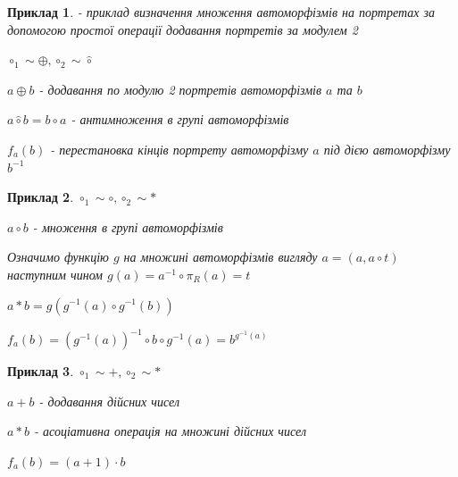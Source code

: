\documentclass[a4paper,12pt]{article} \usepackage{a4wide}
\numberwithin{equation}{subsection}
\newtheorem{example}{Приклад}[subsection]
\begin{document}
  \begin{example}
     - приклад визначення
    множення автоморфізмів на портретах за допомогою простої операції
    додавання портретів за модулем 2

    $ \circ_1 \sim \oplus , \circ_2 \sim \hat{\circ} $

    $a \oplus b$ - додавання по модулю 2 портретів автоморфізмів $a$
    та $b$

    $a \hat{\circ} b= b \circ a$ - антимноження в групі автоморфізмів

    $f_a(b)$ - перестановка кінців портрету автоморфізму $a$ під дією
    автоморфізму $b^{-1}$

  \end{example}
  \begin{example}

    $ \circ_1 \sim \circ , \circ_2 \sim * $





    $a \circ b$ - множення в групі автоморфізмів

    Означимо функцію $g$ на множині автоморфізмів вигляду $a=(a,a
    \circ t)$ наступним чином $g(a)=a^{-1} \circ \pi_R(a)=t$

    $a * b=g(g^{-1}(a)\circ g^{-1}(b))$

    $f_a(b)=(g^{-1}(a))^{-1}\circ b \circ g^{-1}(a)=b^{g^{-1}(a)}$



  \end{example}

    \begin{example}

      $ \circ_1 \sim + , \circ_2 \sim * $





      $a + b$ - додавання дійсних чисел

      $a * b$ - асоціативна операція на множині дійсних чисел



      $f_a(b)=(a+1)\cdot b$



    \end{example}
\end{document}
